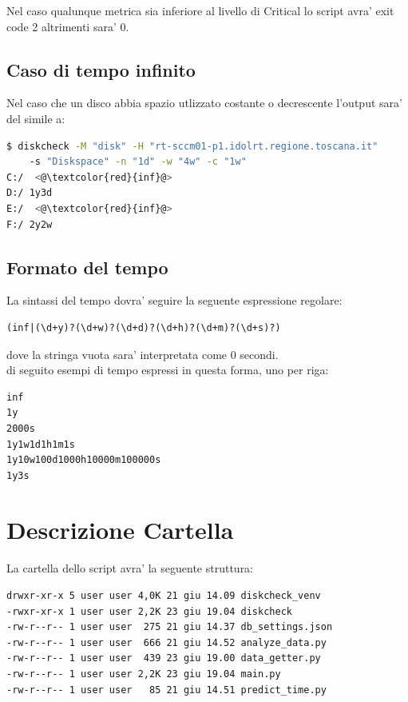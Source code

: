 \documentclass{article}
\begin{document}
Nel caso qualunque metrica sia inferiore al livello di Critical lo script avra' exit code 2 altrimenti sara' 0.

\subsection*{Caso di tempo infinito}
Nel caso che un disco abbia spazio utlizzato costante o decrescente l'output sara' del simile a:

\begin{lstlisting}[language=Bash]
$ diskcheck -M "disk" -H "rt-sccm01-p1.idolrt.regione.toscana.it" 
    -s "Diskspace" -n "1d" -w "4w" -c "1w"
C:/  <@\textcolor{red}{inf}@>
D:/ 1y3d
E:/  <@\textcolor{red}{inf}@>
F:/ 2y2w
\end{lstlisting}

\subsection*{Formato del tempo}
La sintassi del tempo dovra' seguire la seguente espressione regolare:

\begin{lstlisting}[]
(inf|(\d+y)?(\d+w)?(\d+d)?(\d+h)?(\d+m)?(\d+s)?) 
\end{lstlisting}

dove la stringa vuota sara' interpretata come 0 secondi.
\\
di seguito esempi di tempo espressi in questa forma, uno per riga:

\begin{lstlisting}[language=Bash]
inf
1y
2000s
1y1w1d1h1m1s
1y10w100d1000h10000m100000s
1y3s
\end{lstlisting}


\clearpage

\section*{Descrizione Cartella}
La cartella dello script avra' la seguente struttura:
\begin{lstlisting}[language=Bash]
drwxr-xr-x 5 user user 4,0K 21 giu 14.09 diskcheck_venv
-rwxr-xr-x 1 user user 2,2K 23 giu 19.04 diskcheck
-rw-r--r-- 1 user user  275 21 giu 14.37 db_settings.json
-rw-r--r-- 1 user user  666 21 giu 14.52 analyze_data.py
-rw-r--r-- 1 user user  439 23 giu 19.00 data_getter.py
-rw-r--r-- 1 user user 2,2K 23 giu 19.04 main.py
-rw-r--r-- 1 user user   85 21 giu 14.51 predict_time.py
\end{lstlisting}
\end{document}
